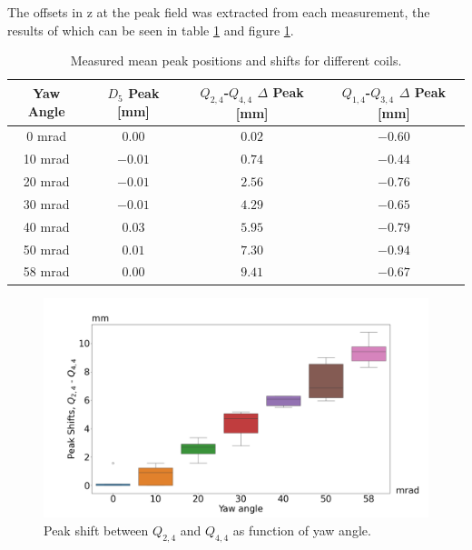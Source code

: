 The offsets in z at the peak field was extracted from each
measurement, the results of which can be seen in table \ref{tab:delta-peaks}
and figure \ref{fig:measured-peak-shifts}. 

\begin{table}[h!]
    \begin{center}
        \begin{tabular}{c c c c}
            Yaw Angle & $D_5$ Peak [mm] & $Q_{2,4}$-$Q_{4,4}$ $\Delta$ Peak [mm] & $Q_{1,4}$-$Q_{3,4}$ $\Delta$ Peak [mm] \\
            \hline
            0 mrad    & $0.00$          & $0.02$                                  & $-0.60$                                 \\
            10 mrad   & $-0.01$         & $0.74$                                  & $-0.44$                                 \\
            20 mrad   & $-0.01$         & $2.56$                                  & $-0.76$                                 \\
            30 mrad   & $-0.01$         & $4.29$                                  & $-0.65$                                 \\
            40 mrad   & $0.03$          & $5.95$                                  & $-0.79$                                 \\
            50 mrad   & $0.01$          & $7.30$                                  & $-0.94$                                 \\
            58 mrad   & $0.00$          & $9.41$                                  & $-0.67$                                 \\
        \end{tabular}
        \caption{Measured mean peak positions and shifts for different coils.}
        \label{tab:delta-peaks}
    \end{center}
\end{table}

\begin{figure}[!h]
    \centering
    \includegraphics[width=0.9\linewidth]{figs/measured-peak-shifts}
    \caption{Peak shift between $Q_{2,4}$ and $Q_{4,4}$ as function
    of yaw angle.}
    \label{fig:measured-peak-shifts}
\end{figure}

